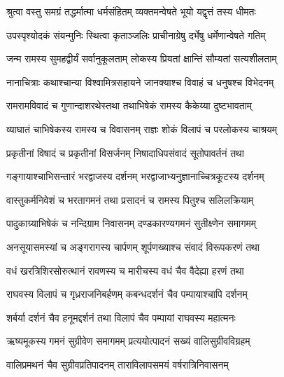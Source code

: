 
\textlink{}
\translink{}

\storymeta

\twolineshloka
{श्रुत्वा वस्तु समग्रं तद्धर्मात्मा धर्मसंहितम्}
{व्यक्तमन्वेषते भूयो यद्वृत्तं तस्य धीमतः} %

\twolineshloka
{उपस्पृश्योदकं संयन्मुनिः स्थित्वा कृताञ्जलिः}
{प्राचीनाग्रेषु दर्भेषु धर्मेणान्वेषते गतिम्} %

\twolineshloka
{जन्म रामस्य सुमहद्वीर्यं सर्वानुकूलताम्}
{लोकस्य प्रियतां क्षान्तिं सौम्यतां सत्यशीलताम्} %

\twolineshloka
{नानाचित्राः कथाश्चान्या विश्वामित्रसहायने}
{जानक्याश्च विवाहं च धनुषश्च विभेदनम्} %

\twolineshloka
{रामरामविवादं च गुणान्दाशरथेस्तथा}
{तथाभिषेकं रामस्य कैकेय्या दुष्टभावताम्} %

\twolineshloka
{व्याघातं चाभिषेकस्य रामस्य च विवासनम्}
{राज्ञः शोकं विलापं च परलोकस्य चाश्रयम्} %

\twolineshloka
{प्रकृतीनां विषादं च प्रकृतीनां विसर्जनम्}
{निषादाधिपसंवादं सूतोपावर्तनं तथा} %

\twolineshloka
{गङ्गायाश्चाभिसन्तारं भरद्वाजस्य दर्शनम्}
{भरद्वाजाभ्यनुज्ञानाच्चित्रकूटस्य दर्शनम्} %

\twolineshloka
{वास्तुकर्मनिवेशं च भरतागमनं तथा}
{प्रसादनं च रामस्य पितुश्च सलिलक्रियाम्} %

\twolineshloka
{पादुकाग्र्याभिषेकं च नन्दिग्राम निवासनम्}
{दण्डकारण्यगमनं सुतीक्ष्णेन समागमम्} %

\twolineshloka
{अनसूयासमस्यां च अङ्गरागस्य चार्पणम्}
{शूर्पणख्याश्च संवादं विरूपकरणं तथा} %

\twolineshloka
{वधं खरत्रिशिरसोरुत्थानं रावणस्य च}
{मारीचस्य वधं चैव वैदेह्या हरणं तथा} %

\twolineshloka
{राघवस्य विलापं च गृध्रराजनिबर्हणम्}
{कबन्धदर्शनं चैव पम्पायाश्चापि दर्शनम्} %

\twolineshloka
{शर्बर्या दर्शनं चैव हनूमद्दर्शनं तथा}
{विलापं चैव पम्पायां राघवस्य महात्मनः} %

\twolineshloka
{ऋष्यमूकस्य गमनं सुग्रीवेण समागमम्}
{प्रत्ययोत्पादनं सख्यं वालिसुग्रीवविग्रहम्} %

\twolineshloka
{वालिप्रमथनं चैव सुग्रीवप्रतिपादनम्}
{ताराविलापसमयं वर्षरात्रिनिवासनम्} %

